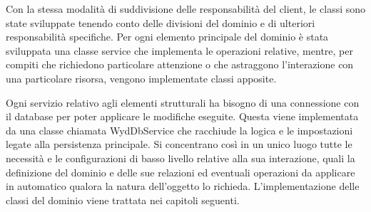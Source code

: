 Con la stessa modalità di suddivisione delle responsabilità del client, 
le classi sono state sviluppate tenendo conto delle divisioni del dominio
e di ulteriori responsabilità specifiche. 
Per ogni elemento principale del dominio è stata sviluppata una classe service che implementa le operazioni relative,
mentre, per compiti che richiedono particolare attenzione o che astraggono l'interazione con una particolare risorsa, 
vengono implementate classi apposite.\\
\clearpage


Ogni servizio relativo agli elementi strutturali ha bisogno di una connessione con il database 
per poter applicare le modifiche eseguite.
Questa viene implementata da una classe chiamata WydDbService che racchiude la logica 
e le impostazioni legate alla persistenza principale.
Si concentrano così in un unico luogo tutte le necessità e 
le configurazioni di basso livello relative alla sua interazione,
quali la definizione del dominio e delle sue relazioni ed 
eventuali operazioni da applicare in automatico qualora la natura dell'oggetto lo richieda.
L'implementazione delle classi del dominio viene trattata nei capitoli seguenti.\\

